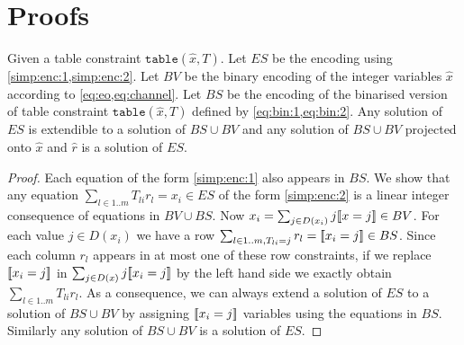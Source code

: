 \documentclass[a4paper,UKenglish,cleveref,autoref,thm-restate]{lipics-v2021}
\begin{document}




\appendix
\newpage

\section{Proofs}
\label{appendix:proofs}

\setcounter{theorem}{3}
\begin{theorem}
    Given a table constraint $\texttt{table}(\hat{x},T)$.
    Let $ES$ be the encoding using \cref{simp:enc:1,simp:enc:2}.
    Let $BV$ be the binary encoding of the integer variables $\hat{x}$ according to \cref{eq:eo,eq:channel}.
    Let $BS$ be the encoding of the binarised version of table constraint $\texttt{table}(\hat{x},T)$  defined
    by \cref{eq:bin:1,eq:bin:2}.
    Any solution of $ES$ is extendible to a solution of $BS \cup BV$ and any solution of $BS \cup BV$ projected onto $\hat{x}$ and $\hat{r}$ is a solution of $ES$.
\begin{proof}
    Each equation of the form \cref{simp:enc:1}
    also appears in $BS$.
    We show that any equation $\sum_{l \in 1..m} T_{li}r_l = x_i \in ES$ of the form 
    \cref{simp:enc:2} is a linear integer consequence of equations in $BV \cup BS$. 
    Now $x_i = \sum_{j \in D(x_i)} j [\![x = j]\!] \in BV$.
    For each value $j \in D(x_i)$ we have a row
    $\sum_{l \in 1..m, T_{li} = j} r_l = [\![x_i = j]\!] \in BS$. 
    Since each column $r_l$ appears in at most one of these 
    row constraints, if we replace $[\![x_i = j]\!]$ in $\sum_{j \in D(x)} j [\![x_i = j]\!]$ by the left hand side
    we exactly obtain $\sum_{l \in 1..m} T_{li}r_l$.
    As a consequence, we can always extend a solution of $ES$ to a solution of
    $BS \cup BV$ by assigning $[\![x_i = j]\!]$ variables using the equations in $BS$.
    Similarly any solution of $BS \cup BV$ is a solution of $ES$.
\end{proof}    
\end{theorem}
\end{document}
